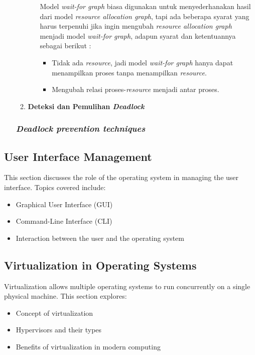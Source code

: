 \documentclass[12pt]{article}
\begin{document}
\begin{itemize}
\begin{enumerate}
\begin{enumerate}
                        \hspace{1cm}
                        Model \textit{wait-for graph} biasa digunakan untuk menyederhanakan hasil dari model \textit{resource allocation graph}, tapi ada beberapa syarat yang harus terpenuhi jika ingin mengubah \textit{resource allocation graph} menjadi model \textit{wait-for graph}, adapun syarat dan ketentuannya sebagai berikut : 
                        \begin{itemize}
                            \item Tidak ada \textit{resource}, jadi model \textit{wait-for graph} hanya dapat menampilkan proses tanpa menampilkan \textit{resource}.
                            
                            \item  Mengubah relasi proses-\textit{resource} menjadi antar proses.\newline
                        \end{itemize}

                \end{enumerate}
            \item \textbf{Deteksi dan Pemulihan \textit{Deadlock}}
        \end{enumerate}
    \subsubsection{ \textit{Deadlock prevention techniques}}
\end{itemize}

\subsection{User Interface Management}
This section discusses the role of the operating system in managing the user interface. Topics covered include:
\begin{itemize}
    \item Graphical User Interface (GUI)
    \item Command-Line Interface (CLI)
    \item Interaction between the user and the operating system
\end{itemize}

\subsection{Virtualization in Operating Systems}
Virtualization allows multiple operating systems to run concurrently on a single physical machine. This section explores:
\begin{itemize}
    \item Concept of virtualization
    \item Hypervisors and their types
    \item Benefits of virtualization in modern computing
\end{itemize}
\end{document}
